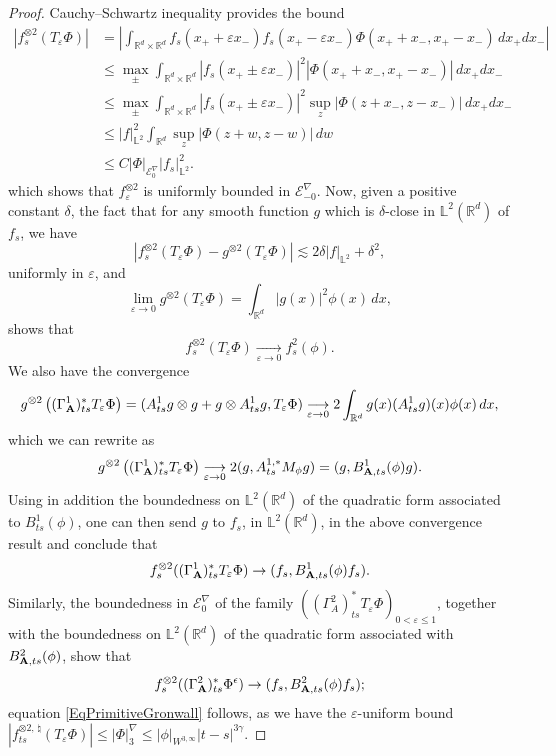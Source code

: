 \documentclass[11pt,a4paper]{amsart}
\newcommand{\RR}{\mathbb{R}}  \newcommand{\CC}{\mathbb{C}}  \newcommand{\LL}{\mathbb{L}}  \newcommand{\WW}{\mathbb{W}}
\newcommand{\mcE}{\mathcal{E}}
\renewcommand{\leq}{\leqslant}
\theoremstyle{plain}%
\theoremstyle{definition}
\theoremstyle{remark}
\numberwithin{equation}{section} %
\begin{document}
\begin{proof}
\smallskip
 Cauchy--Schwartz inequality provides the  bound
\begin{equation*}
\begin{split}
|f^{\otimes 2}_s (T_\varepsilon \Phi)| &= \left|\int_{\RR^d \times \RR^d} f_s(x_+ + \varepsilon x_-) f_s(x_+ - \varepsilon x_-) \Phi(x_+ +  x_-,x_+ -  x_-)\,dx_+ dx_- \right|  \\
&\leq \max_\pm \int_{\RR^d \times \RR^d} |f_s(x_+ \pm \varepsilon x_-)|^2  |\Phi(x_+ +  x_-,x_+ -  x_-)|\,dx_+ dx_- \\
&\leq  \max_\pm   \int_{\RR^d \times \RR^d} |f_s(x_+ \pm \varepsilon x_-)|^2  \sup_z |\Phi(z +  x_-,z -  x_-)|\,dx_+ dx_- \\
&\leq |f|_{\LL^2}^2 \int_{\RR^d } \sup_{z}| \Phi(z +  w,z -  w)|\,dw  \\
&\leq C |\Phi|_{\mcE^\nabla_0} |f_s|_{\LL^2}^2. 
\end{split}
\end{equation*}
which shows that $f^{\otimes 2}_\varepsilon$ is uniformly bounded in $\mcE^\nabla_{-0}$.
Now, given a positive constant $\delta$, the fact that for any smooth function $g$ which is $\delta$-close in $\LL^2(\RR^d)$ of $f_s$, we have
$$ 
|f^{\otimes 2}_s (T_\varepsilon \Phi)- g^{\otimes 2} (T_\varepsilon \Phi) | \lesssim 2\delta |f|_{\LL^2} + \delta^2,
$$ 
uniformly in $\varepsilon$, and
$$
\lim_{\varepsilon\to 0} g^{\otimes 2} (T_\varepsilon \Phi) = \int_{\RR^d }|g(x)|^2 \phi (x)\,dx,
$$
shows that 
$$
f^{\otimes 2}_s (T_\varepsilon \Phi) \underset{\varepsilon\to 0}{\longrightarrow} f_s^2(\phi). 
$$
We also have the convergence 
$$
g^{\otimes 2} \left((\Gamma_{\bfA}^1)^*_{ts} T_\varepsilon \Phi\right) = ( A^1_{ts} g \otimes g + g \otimes A^1_{ts} g, T_\varepsilon \Phi ) \underset{\varepsilon\to 0}{\longrightarrow} 2 \int_{\RR^d } g(x) (A^1_{ts}g)(x) \phi (x)\, dx,
$$
which we can rewrite as
$$
g^{\otimes 2} \left((\Gamma_{\bf A}^1)^*_{ts} T_\varepsilon \Phi\right) \underset{\varepsilon\to 0}{\longrightarrow} 2( g , A^{1,*}_{ts} M_\phi g ) = (g,B^1_{{\bf A},ts}(\phi)g).
$$
Using in addition the boundedness on $\LL^2(\RR^d)$ of the quadratic form associated to $B^1_{ts}(\phi)$, one can then send $g$ to $f_s$, in $\LL^2(\RR^d)$, in the above convergence result and conclude that
$$
f^{\otimes 2}_s ((\Gamma_{\bf A}^1)_{ts}^* T_\varepsilon \Phi) \to ( f_s , B^1_{{\bf A},ts}(\phi) f_s). 
$$
Similarly, the boundedness in $\mcE^\nabla_0$ of the family $((\Gamma_A^2)^*_{ts}  T_\varepsilon \Phi)_{0<\varepsilon\leq 1}$, together with the boundedness on $\LL^2(\RR^d)$ of the quadratic form associated with $B^2_{{\bf A},ts}(\phi)$, show that 
$$
f^{\otimes 2}_s ((\Gamma_{\bf A}^2)_{ts}^*\Phi^\epsilon) \to ( f_s , B^2_{{\bf A},ts}(\phi) f_s);
$$
equation \eqref{EqPrimitiveGronwall} follows, as we have the $\varepsilon$-uniform bound $|f^{\otimes 2,\,\natural}_{ts}(T_\varepsilon \Phi)| \leq  |\Phi|_{3}^\nabla \leq |\phi|_{W^{3,\infty}}|t-s|^{3\gamma}$.  
\end{proof} 
\end{document}
